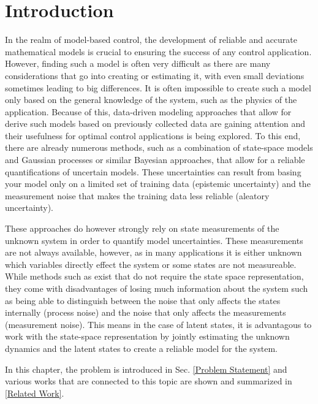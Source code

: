 \chapter{Introduction}
\label{sec:introduction}

In the realm of model-based control, the development of reliable and accurate mathematical models is crucial to ensuring the success of any control application. However, finding such a model is often very difficult as there are many considerations that go into creating or estimating it, with even small deviations sometimes leading to big differences. It is often impossible to create such a model only based on the general knowledge of the system, such as the physics of the application. Because of this, data-driven modeling approaches that allow for derive such models based on previously collected data are gaining attention and their usefulness for optimal control applications is being explored. To this end, there are already numerous methods, such as a combination of state-space models and Gaussian processes \cite{Williams_06} or similar Bayesian approaches, that allow for a reliable quantifications of uncertain models. These uncertainties can result from basing your model only on a limited set of training data (epistemic uncertainty) and the measurement noise that makes the training data less reliable (aleatory uncertainty). 

These approaches do however strongly rely on state measurements of the unknown system in order to quantify model uncertainties. These measurements are not always available, however, as in many applications it is either unknown which variables directly effect the system or some states are not measureable. While methods such as \cite{Maiworm_21} exist that do not require the state space representation, they come with disadvantages of losing much information about the system such as being able to distinguish between the noise that only affects the states internally (process noise) and the noise that only affects the measurements (measurement noise). This means in the case of latent states, it is advantagous to work with the state-space representation by jointly estimating the unknown dynamics and the latent states to create a reliable model for the system.

In this chapter, the problem is introduced in Sec. \ref{Problem Statement} and various works that are connected to this topic are shown and summarized in \ref{Related Work}.

